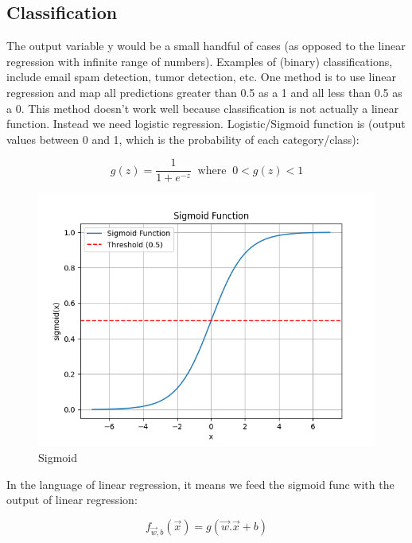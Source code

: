 \documentclass[12pt]{report}
\begin{document}
\subsection{Classification}

The output variable y would be a small handful of cases (as opposed to the linear regression with infinite range of numbers). Examples of (binary) classifications, include email spam detection, tumor detection, etc.  One method is to use linear regression and map all predictions greater than 0.5 as a 1 and all less than 0.5 as a 0. This method doesn't work well because classification is not actually a linear function. Instead we need logistic regression. Logistic/Sigmoid function is (output values between 0 and 1, which is the probability of each category/class):

\begin{equation}
g(z) = \frac{1}{1+e^{-z}} \;\; \text{where} \;\; 0<g(z)<1
\end{equation}

\begin{figure}[H]
  \centering
  \includegraphics[trim =0.0cm 0.0cm 0.0cm 0.0cm, clip, scale=0.5]{pics/sigmoid.png}
  \caption{Sigmoid}
\end{figure}

In the language of linear regression, it means we feed the sigmoid func with the output of linear regression:

\begin{equation}
  f_{\overrightarrow{w},b}(\overrightarrow{x}) = g(\overrightarrow{w} . \overrightarrow{x}+b)
\end{equation}
\end{document}
